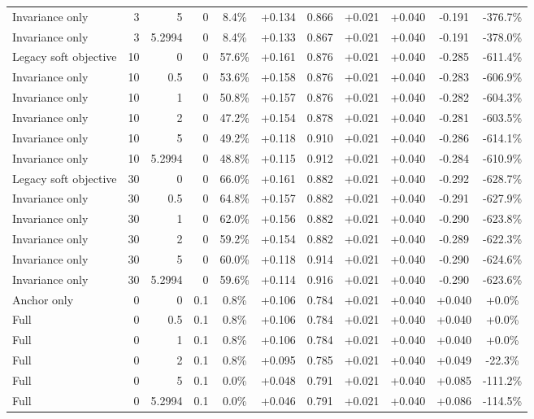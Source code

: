 \begin{table}[htbp]
\begin{tabular}{lrrrccccccc}
Invariance only & 3 & 5 & 0 & 8.4\% & +0.134 & 0.866 & +0.021 & +0.040 & -0.191 & -376.7\% \\
Invariance only & 3 & 5.2994 & 0 & 8.4\% & +0.133 & 0.867 & +0.021 & +0.040 & -0.191 & -378.0\% \\
Legacy soft objective & 10 & 0 & 0 & 57.6\% & +0.161 & 0.876 & +0.021 & +0.040 & -0.285 & -611.4\% \\
Invariance only & 10 & 0.5 & 0 & 53.6\% & +0.158 & 0.876 & +0.021 & +0.040 & -0.283 & -606.9\% \\
Invariance only & 10 & 1 & 0 & 50.8\% & +0.157 & 0.876 & +0.021 & +0.040 & -0.282 & -604.3\% \\
Invariance only & 10 & 2 & 0 & 47.2\% & +0.154 & 0.878 & +0.021 & +0.040 & -0.281 & -603.5\% \\
Invariance only & 10 & 5 & 0 & 49.2\% & +0.118 & 0.910 & +0.021 & +0.040 & -0.286 & -614.1\% \\
Invariance only & 10 & 5.2994 & 0 & 48.8\% & +0.115 & 0.912 & +0.021 & +0.040 & -0.284 & -610.9\% \\
Legacy soft objective & 30 & 0 & 0 & 66.0\% & +0.161 & 0.882 & +0.021 & +0.040 & -0.292 & -628.7\% \\
Invariance only & 30 & 0.5 & 0 & 64.8\% & +0.157 & 0.882 & +0.021 & +0.040 & -0.291 & -627.9\% \\
Invariance only & 30 & 1 & 0 & 62.0\% & +0.156 & 0.882 & +0.021 & +0.040 & -0.290 & -623.8\% \\
Invariance only & 30 & 2 & 0 & 59.2\% & +0.154 & 0.882 & +0.021 & +0.040 & -0.289 & -622.3\% \\
Invariance only & 30 & 5 & 0 & 60.0\% & +0.118 & 0.914 & +0.021 & +0.040 & -0.290 & -624.6\% \\
Invariance only & 30 & 5.2994 & 0 & 59.6\% & +0.114 & 0.916 & +0.021 & +0.040 & -0.290 & -623.6\% \\
Anchor only & 0 & 0 & 0.1 & 0.8\% & +0.106 & 0.784 & +0.021 & +0.040 & +0.040 & +0.0\% \\
Full & 0 & 0.5 & 0.1 & 0.8\% & +0.106 & 0.784 & +0.021 & +0.040 & +0.040 & +0.0\% \\
Full & 0 & 1 & 0.1 & 0.8\% & +0.106 & 0.784 & +0.021 & +0.040 & +0.040 & +0.0\% \\
Full & 0 & 2 & 0.1 & 0.8\% & +0.095 & 0.785 & +0.021 & +0.040 & +0.049 & -22.3\% \\
Full & 0 & 5 & 0.1 & 0.0\% & +0.048 & 0.791 & +0.021 & +0.040 & +0.085 & -111.2\% \\
Full & 0 & 5.2994 & 0.1 & 0.0\% & +0.046 & 0.791 & +0.021 & +0.040 & +0.086 & -114.5\% \\

\end{tabular}
\end{table}
